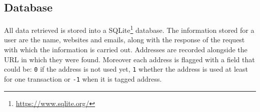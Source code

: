 \subsection{Database}
All data retrieved is stored into a
SQLite\footnote{\url{https://www.sqlite.org/}} database. The information stored
for a user are the name, websites and emails, along with the response of the
request
with which the information is carried out. Addresses are recorded alongside the
URL in which they were found. Moreover each address is flagged with a
field that could be: \texttt{0} if the address is not used yet, \texttt{1}
whether the address is used at least for one transaction or \texttt{-1} when it
is tagged address.